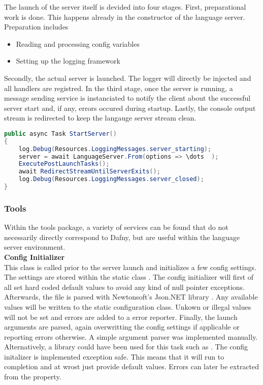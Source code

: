 The launch of the server itself is devided into four stages. First, preparational work is done. This happens already in the constructor of the language server. Preparation includes
\begin{itemize}
    \item Reading and processing config variables
    \item Setting up the logging framework
\end{itemize}
Secondly, the actual server is launched. The logger will directly be injected and all handlers are registred. In the third stage, once the server is running, a message sending service is instanciated to notify the client about the successful server start and, if any, errors occured during startup. Lastly, the console output stream is redirected to keep the langauge server stream clean.

\begin{lstlisting}[language=csharp, caption={Starting the Language Server}, captionpos=b, label={lst:serverstart}]
public async Task StartServer()
{
    log.Debug(Resources.LoggingMessages.server_starting);
    server = await LanguageServer.From(options => \dots  );
    ExecutePostLaunchTasks();
    await RedirectStreamUntilServerExits();
    log.Debug(Resources.LoggingMessages.server_closed);
}
\end{lstlisting}

\subsubsection{Tools}
Within the tools package, a variety of services can be found that do not necessarily directly correspond to Dafny, but are useful within the language server environment.\\

\textbf{Config Initializer}\\
This class is called prior to the server launch and initializes a few config settings. The settings are stored within the static class . The config initializer will first of all set hard coded default values to avoid any kind of null pointer exceptions. Afterwards, the file  is parsed with Newtonsoft's Json.NET library \cite{jsondotnet}. Any available values will be written to the static configuration class. Unkown or illegal values will not be set and errors are added to a error reporter. Finally, the launch arguments are parsed, again overwritting the config settings if applicable or reporting errors otherwise. A simple argument parser was implemented manually. Alternatively, a library could have been used for this task such as \cite{clparser}. The config initalizer is implemented exception safe. This means that it will run to completion and at wrost just provide default values. Errors can later be extracted from the  property.\\


